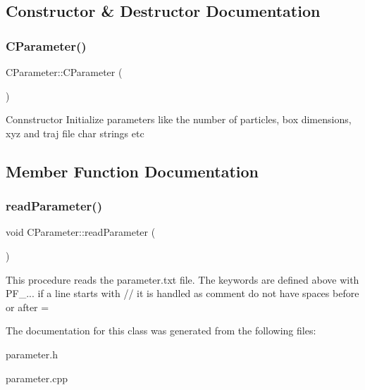 \subsection{Constructor \& Destructor Documentation}
\mbox{\label{classCParameter_aa802146fddbef2877f2034ed3dc16cd6}} 
\subsubsection{\texorpdfstring{C\+Parameter()}{CParameter()}}
{\footnotesize\ttfamily C\+Parameter\+::\+C\+Parameter (\begin{DoxyParamCaption}{ }\end{DoxyParamCaption})}

Connstructor Initialize parameters like the number of particles, box dimensions, xyz and traj file char strings etc 

\subsection{Member Function Documentation}
\mbox{\label{classCParameter_a026d8da357935e384b478913e036f3bc}} 
\subsubsection{\texorpdfstring{read\+Parameter()}{readParameter()}}
{\footnotesize\ttfamily void C\+Parameter\+::read\+Parameter (\begin{DoxyParamCaption}{ }\end{DoxyParamCaption})}

This procedure reads the parameter.\+txt file. The keywords are defined above with P\+F\+\_\+... if a line starts with // it is handled as comment do not have spaces before or after = 

The documentation for this class was generated from the following files\+:\begin{DoxyCompactItemize}
\item 
parameter.\+h\item 
parameter.\+cpp\end{DoxyCompactItemize}
